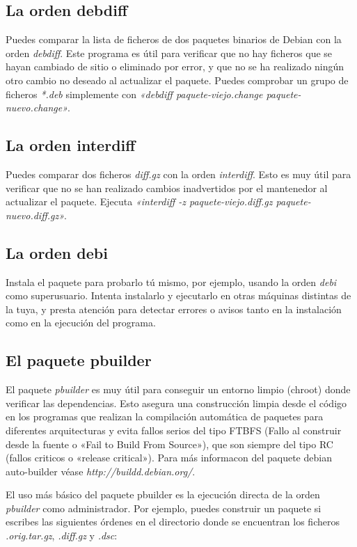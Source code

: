 \documentclass[letterpaper,12pt,spanish]{manual}
\begin{document}
\subsection{La orden debdiff}

Puedes comparar la lista de ficheros de dos paquetes binarios de Debian con la orden \emph{debdiff}. Este programa es útil para verificar que no hay ficheros que se hayan cambiado de sitio o eliminado por error, y que no se ha realizado ningún otro cambio no deseado al actualizar el paquete. Puedes comprobar un grupo de ficheros \emph{*.deb} simplemente con \emph{«debdiff paquete-viejo.change paquete-nuevo.change»}.


\subsection{La orden interdiff}

Puedes comparar dos ficheros \emph{diff.gz} con la orden \emph{interdiff}. Esto es muy útil para verificar que no se han realizado cambios inadvertidos por el mantenedor al actualizar el paquete. Ejecuta \emph{«interdiff -z paquete-viejo.diff.gz paquete-nuevo.diff.gz»}.


\subsection{La orden debi}

Instala el paquete para probarlo tú mismo, por ejemplo, usando la orden \emph{debi} como superusuario. Intenta instalarlo y ejecutarlo en otras máquinas distintas de la tuya, y presta atención para detectar errores o avisos tanto en la instalación como en la ejecución del programa.


\subsection{El paquete pbuilder}

El paquete \emph{pbuilder} es muy útil para conseguir un entorno limpio (chroot) donde verificar las dependencias. Esto asegura una construcción limpia desde el código en los programas que realizan la compilación automática de paquetes para diferentes arquitecturas y evita fallos serios del tipo FTBFS (Fallo al construir desde la fuente o «Fail to Build From Source»), que son siempre del tipo RC (fallos criticos o «release critical»). Para más informacon del paquete debian auto-builder véase \emph{http://buildd.debian.org/}.

El uso más básico del paquete pbuilder es la ejecución directa de la orden \emph{pbuilder} como administrador. Por ejemplo, puedes construir un paquete si escribes las siguientes órdenes en el directorio donde se encuentran los ficheros \emph{.orig.tar.gz}, \emph{.diff.gz} y \emph{.dsc}:
\end{document}
